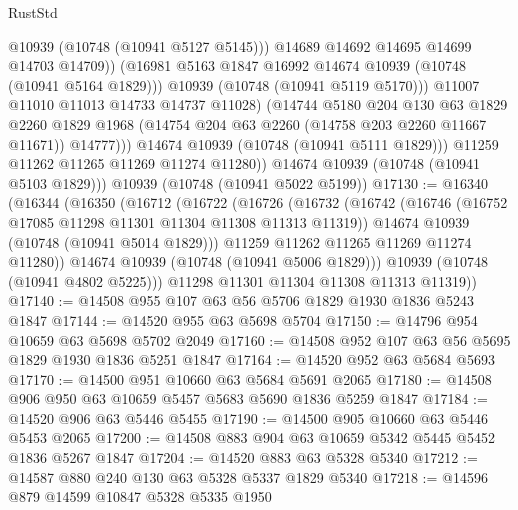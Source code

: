 \begin{lexlean}{RustStd}
\begin{coremodule}
{\begin{coremodule}
{{{{{                          @10939
                          (@10748 (@10941 @5127 @5145)))
                        @14689
                        @14692
                        @14695
                        @14699
                        @14703
                        @14709))
                    (@16981 @5163 @1847 @16992 @14674 @10939 (@10748 (@10941 @5164 @1829)))
                    @10939
                    (@10748 (@10941 @5119 @5170)))
                  @11007
                  @11010
                  @11013
                  @14733
                  @14737
                  @11028)
                (@14744
                  @5180
                  @204
                  @130
                  @63
                  @1829
                  @2260
                  @1829
                  @1968
                  (@14754 @204 @63 @2260 (@14758 @203 @2260 @11667 @11671))
                  @14777)))
            @14674
            @10939
            (@10748 (@10941 @5111 @1829)))
          @11259
          @11262
          @11265
          @11269
          @11274
          @11280))
      @14674
      @10939
      (@10748 (@10941 @5103 @1829)))
    @10939
    (@10748 (@10941 @5022 @5199))
@17130 := @16340
    (@16344
      (@16350
        (@16712
          (@16722
            (@16726
              (@16732
                (@16742
                  (@16746 (@16752 @17085 @11298 @11301 @11304 @11308 @11313 @11319))
                  @14674
                  @10939
                  (@10748 (@10941 @5014 @1829)))
                @11259
                @11262
                @11265
                @11269
                @11274
                @11280))
            @14674
            @10939
            (@10748 (@10941 @5006 @1829)))
          @10939
          (@10748 (@10941 @4802 @5225)))
        @11298
        @11301
        @11304
        @11308
        @11313
        @11319))
@17140 := @14508 @955 @107 @63 @56 @5706 @1829 @1930 @1836 @5243 @1847
@17144 := @14520 @955 @63 @5698 @5704
@17150 := @14796 @954 @10659 @63 @5698 @5702 @2049
@17160 := @14508 @952 @107 @63 @56 @5695 @1829 @1930 @1836 @5251 @1847
@17164 := @14520 @952 @63 @5684 @5693
@17170 := @14500 @951 @10660 @63 @5684 @5691 @2065
@17180 := @14508 @906 @950 @63 @10659 @5457 @5683 @5690 @1836 @5259 @1847
@17184 := @14520 @906 @63 @5446 @5455
@17190 := @14500 @905 @10660 @63 @5446 @5453 @2065
@17200 := @14508 @883 @904 @63 @10659 @5342 @5445 @5452 @1836 @5267 @1847
@17204 := @14520 @883 @63 @5328 @5340
@17212 := @14587 @880 @240 @130 @63 @5328 @5337 @1829 @5340
@17218 := @14596 @879 @14599 @10847 @5328 @5335 @1950
}}}}}
\end{coremodule}}
\end{coremodule}
\end{lexlean}
